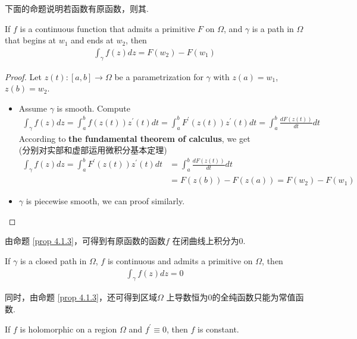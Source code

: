 \vspace{2em}
下面的命题说明若函数有原函数，则其.
\begin{proposition}\label{prop 4.1.3}
	If $f$ is a continuous function that admits a primitive $F$ on $\Omega$, and $\gamma$ is a path in $\Omega$ that begins at $w_1$ and ends at $w_2$, then
	\begin{align}
		\int_{\gamma}{f(z) dz}=  F(w_2) - F(w_1)
	\end{align}
	
	\vspace{2em}
	\begin{proof}
		Let $z(t) : [a , b] \longrightarrow \Omega$ be a parametrization for $\gamma$ with $z(a) = w_1$, $z(b) = w_2$.
		\begin{itemize}
			\item Assume $\gamma$ is smooth. Compute
			\begin{align}
				\int_{\gamma}{f(z) dz} = \int_{a}^{b}{f(z(t)) z^{'}(t) dt} = \int_{a}^{b}{F^{'}(z(t)) z^{'}(t) dt} = \int_{a}^{b}{\frac{dF(z(t))}{dt} dt}
			\end{align}
			According to \textbf{the fundamental theorem of calculus}, we get\\
			(分别对实部和虚部运用微积分基本定理)
			\begin{align}
				\int_{\gamma}{f(z) dz} 
				= \int_{a}^{b}{F^{'}(z(t)) z^{'}(t) dt} 
				&= \int_{a}^{b}{\frac{dF(z(t))}{dt} dt} \\
				&= F(z(b)) - F(z(a)) = F(w_2) - F(w_1)
			\end{align}
			
			\item $\gamma$ is piecewise smooth, we can proof similarly.
		\end{itemize}
	\end{proof}
\end{proposition}

\vspace{2em}
由命题 \ref{prop 4.1.3}，可得到有原函数的函数$f$ 在闭曲线上积分为0.
\begin{corollary}\label{cor 4.1.1}
	If $\gamma$ is a closed path in $\Omega$, $f$ is continuous and admits a primitive on $\Omega$, then
	\begin{align}
		\int_{\gamma}{f(z) dz} = 0
	\end{align}
\end{corollary}

\newpage
同时，由命题 \ref{prop 4.1.3}，还可得到区域$\Omega$ 上导数恒为0的全纯函数只能为常值函数.
\begin{corollary}\label{cor 4.1.2}
	If $f$ is holomorphic on a region $\Omega$ and $f^{'} \equiv 0$, then $f$ is constant.
\end{corollary}

